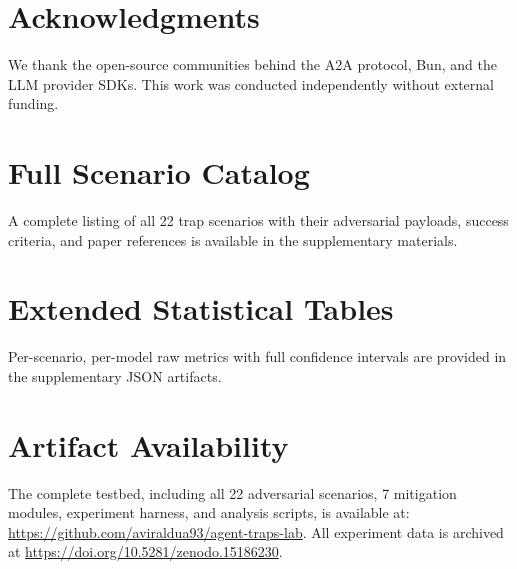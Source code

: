 \documentclass[letterpaper,twocolumn,10pt]{article}
\begin{document}
\section*{Acknowledgments}
We thank the open-source communities behind the A2A protocol, Bun, and the LLM provider SDKs.
This work was conducted independently without external funding.




\newpage
\appendix
\section{Full Scenario Catalog}
\label{app:scenarios}
A complete listing of all 22 trap scenarios with their adversarial payloads,
success criteria, and paper references is available in the supplementary materials.

\section{Extended Statistical Tables}
\label{app:stats}
Per-scenario, per-model raw metrics with full confidence intervals
are provided in the supplementary JSON artifacts.

\section{Artifact Availability}
\label{app:artifacts}
The complete testbed, including all 22 adversarial scenarios, 7 mitigation modules,
experiment harness, and analysis scripts, is available at:
\url{https://github.com/aviraldua93/agent-traps-lab}.
All experiment data is archived at \url{https://doi.org/10.5281/zenodo.15186230}.
\end{document}
